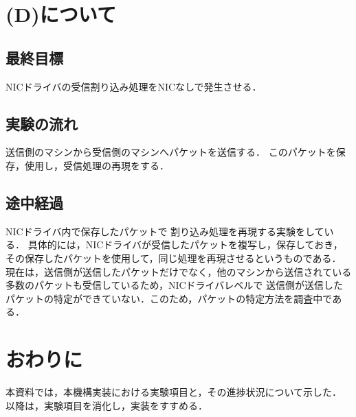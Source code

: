 \documentclass[12pt]{jsarticle}
\begin{document}
\section{(D)について}
\subsection{最終目標}
NICドライバの受信割り込み処理をNICなしで発生させる．
\subsection{実験の流れ}
送信側のマシンから受信側のマシンへパケットを送信する．
このパケットを保存，使用し，受信処理の再現をする．
\subsection{途中経過}
NICドライバ内で保存したパケットで
割り込み処理を再現する実験をしている．
具体的には，NICドライバが受信したパケットを複写し，保存しておき，
その保存したパケットを使用して，同じ処理を再現させるというものである．
現在は，送信側が送信したパケットだけでなく，他のマシンから送信されている多数のパケットも受信しているため，NICドライバレベルで
送信側が送信したパケットの特定ができていない．このため，パケットの特定方法を調査中である．

\section{おわりに}
本資料では，本機構実装における実験項目と，その進捗状況について示した．
以降は，実験項目を消化し，実装をすすめる．
\end{document}

